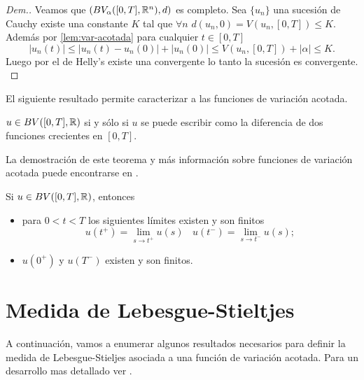 \begin{proof}[Dem.]
{Veamos que $\left(BV_\alpha([0,T],\mathbb{R}^n),d\right)$ es completo. Sea $\{u_n\}$ una sucesión de Cauchy existe una constante $K$ tal que $\forall n$ $d(u_n,0)=V(u_n,[0,T])\leq K$. Además por  \ref{lem:var-acotada} para cualquier $t\in[0,T]$
\begin{equation} \label{eq:desigualdad d}
|u_n(t)|\leq|u_n(t)-u_n(0)|+|u_n(0)|\leq V(u_n,[0,T])+|\alpha|\leq K.
\end{equation}
Luego por el  de Helly's 
existe una  convergente lo tanto la sucesión es convergente.
}
\end{proof}







El siguiente resultado permite caracterizar a las funciones de variación acotada.

\begin{thm}\label{T-VB}
	 $u\in BV([0,T],\mathbb{R})$ si y sólo si $u$ se puede escribir como la diferencia de dos funciones crecientes en $[0,T]$.
\end{thm}

La demostración de este teorema y más información sobre funciones de variación acotada puede encontrarse en \cite{Carter}. %
\begin{cor}
	Si $u\in BV([0,T],\mathbb{R})$, entonces 
	\begin{itemize}
		\item para $0<t<T$ los siguientes límites existen y son finitos
		$$u(t^+)=\lim\limits_{s\to t^+}u(s) \ \ \ \ u(t^-)=\lim\limits_{s\to t^-}u(s);$$
		\item $u(0^+)$ y $u(T^-)$ existen y son finitos.
	\end{itemize}
\end{cor}






\section{Medida de Lebesgue-Stieltjes}
A continuación, vamos a enumerar algunos resultados necesarios para definir la medida de Lebesgue-Stieljes asociada a una función de variación acotada. Para un desarrollo mas detallado ver \cite{folland}.
